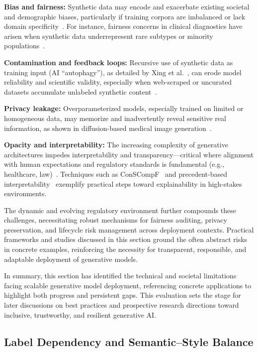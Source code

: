 \documentclass[sigconf]{acmart}
\begin{document}
\textbf{Bias and fairness:} Synthetic data may encode and exacerbate existing societal and demographic biases, particularly if training corpora are imbalanced or lack domain specificity~\cite{ref21,ref24,ref58,ref63,ref81}. For instance, fairness concerns in clinical diagnostics have arisen when synthetic data underrepresent rare subtypes or minority populations~\cite{ref63}.

\textbf{Contamination and feedback loops:} Recursive use of synthetic data as training input (AI ``autophagy''), as detailed by Xing et al.~\cite{ref82}, can erode model reliability and scientific validity, especially when web-scraped or uncurated datasets accumulate unlabeled synthetic content~\cite{ref77,ref78,ref84}.

\textbf{Privacy leakage:} Overparameterized models, especially trained on limited or homogeneous data, may memorize and inadvertently reveal sensitive real information, as shown in diffusion-based medical image generation~\cite{ref21,ref81,ref82,ref88,ref90}.

\textbf{Opacity and interpretability:} The increasing complexity of generative architectures impedes interpretability and transparency—critical where alignment with human expectations and regulatory standards is fundamental (e.g., healthcare, law)~\cite{ref10,ref32,ref60,ref68,ref69,ref78,ref81,ref82}. Techniques such as ConSCompF~\cite{ref68} and precedent-based interpretability~\cite{ref84} exemplify practical steps toward explainability in high-stakes environments.

The dynamic and evolving regulatory environment further compounds these challenges, necessitating robust mechanisms for fairness auditing, privacy preservation, and lifecycle risk management across deployment contexts. Practical frameworks and studies discussed in this section ground the often abstract risks in concrete examples, reinforcing the necessity for transparent, responsible, and adaptable deployment of generative models.

In summary, this section has identified the technical and societal limitations facing scalable generative model deployment, referencing concrete applications to highlight both progress and persistent gaps. This evaluation sets the stage for later discussions on best practices and prospective research directions toward inclusive, trustworthy, and resilient generative AI.

\subsection{Label Dependency and Semantic–Style Balance}
\end{document}
